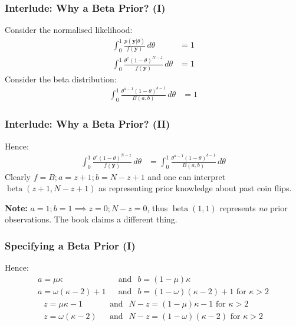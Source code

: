 \documentclass[usenames,dvipsnames,table]{beamer}
\begin{document}
\begin{frame}
\frametitle{Interlude: Why a Beta Prior? (I)}
Consider the normalised likelihood:
\begin{align*}
\int_0^1 \frac{p(\mathbf{y}|\theta)}{f(\mathbf{y})}\, d\theta &= 1 \\
\int_0^1 \frac{\theta^{z}(1-\theta)^{N-z}}
              {f(\mathbf{y})}\, d\theta &= 1 \tag{using 6.2}
\end{align*}
Consider the beta distribution:
\begin{align*}
\int_0^1 \frac{\theta^{a-1} (1-\theta)^{b-1}}
                        {B(a, b)}\, d\theta &= 1\tag{6.3}
\end{align*}
\end{frame}

\begin{frame}
\frametitle{Interlude: Why a Beta Prior? (II)}

Hence:
\begin{align*}
\int_0^1 \frac{\theta^{z}(1-\theta)^{N-z}}
              {f(\mathbf{y})}\, d\theta
&= \int_0^1 \frac{\theta^{a-1} (1-\theta)^{b-1}}
                         {B(a, b)}\, d\theta
\end{align*}
Clearly $f=B; a=z+1; b=N-z+1$ and one can interpret $\operatorname{beta}(z+1, N-z+1)$ as representing prior knowledge about past coin flips.

\vspace{1em}
\textbf{Note:} $a=1; b=1 \implies z=0; N-z=0$, thus $\operatorname{beta}(1, 1)$ represents \emph{no} prior observations. The book claims a different thing.
\end{frame}



\begin{frame}
\frametitle{Specifying a Beta Prior (I)}

Hence:
\begin{align*}
a=\mu\kappa \ \        &\operatorname{and}\ \ b=(1-\mu)\kappa \tag{6.5} \\
a=\omega(\kappa-2)+1 \ \ &\operatorname{and}\ \ b=(1-\omega)(\kappa-2)+1 \text{\ for\ } \kappa>2 \tag{6.6}
\end{align*}
\begin{align*}
z=\mu\kappa-1 \ \ &\operatorname{and}\ \ N-z=(1-\mu)\kappa-1 \text{\ for\ } \kappa>2 \\
z=\omega(\kappa-2) \ \ &\operatorname{and}\ \ N-z=(1-\omega)(\kappa-2) \text{\ for\ } \kappa>2
\end{align*}
\end{frame}
\end{document}
